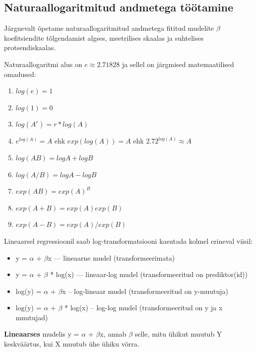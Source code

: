 \documentclass[]{book}
\begin{document}
\hypertarget{naturaallogaritmitud-andmetega-tootamine}{%
\subsection*{Naturaallogaritmitud andmetega töötamine}\label{naturaallogaritmitud-andmetega-tootamine}}

Järgnevalt õpetame naturaallogaritmitud andmetega fititud mudelite \(\beta\) koefitsiendite tõlgendamist algses, meetrilises skaalas ja suhtelises protsendiskaalas.

Naturaallogaritmi alus on \(e \approx 2.71828\) ja sellel on järgmised matemaatilised omadused:

\begin{enumerate}
\def\labelenumi{\arabic{enumi}.}
\item
  \(log(e) = 1\)
\item
  \(log(1) = 0\)
\item
  \(log(A^r) = r * log(A)\)
\item
  \(e^{log(A)} = A\) ehk \(exp(log(A)) = A\) ehk \(2.72^{log(A)} \approx A\)
\item
  \(log(AB)=logA + logB\)
\item
  \(log(A/B)=logA - logB\)
\item
  \(exp(AB) = exp(A)^B\)
\item
  \(exp(A+B) = exp(A)exp(B)\)
\item
  \(exp(A-B) = exp(A)/exp(B)\)
\end{enumerate}

Lineaarsel regressioonil saab log-transformatsiooni kasutada kolmel erineval viisil:

\begin{itemize}
\item
  y = \(\alpha\) + \(\beta\)x --- lineaarne mudel (transformeerimata)
\item
  y = \(\alpha\) + \(\beta\) * log(x) --- lineaar-log mudel (transformeeritud on prediktor(id))
\item
  log(y) = \(\alpha\) + \(\beta\)x -- log-lineaar mudel (transformeeritud on y-muutuja)
\item
  log(y) = \(\alpha\) + \(\beta\) * log(x) -- log-log mudel (transformeeritud on y ja x muutujad)
\end{itemize}

\textbf{Lineaarses} mudelis y = \(\alpha\) + \(\beta\)x, annab \(\beta\) selle, mitu ühikut muutub Y keskväärtus, kui X muutub ühe ühiku võrra.
\end{document}
